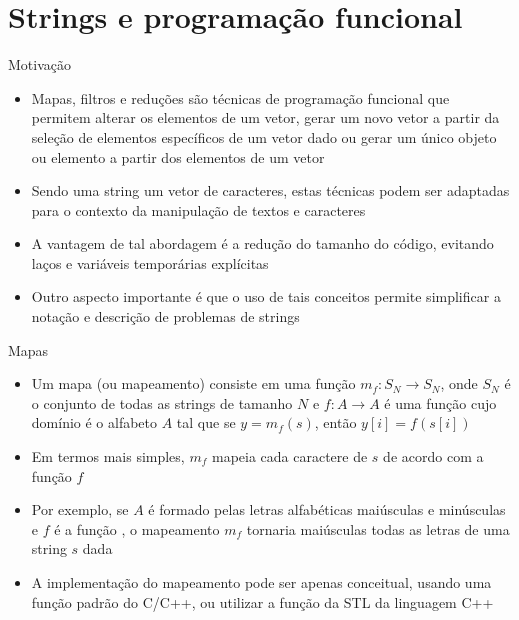 \section{Strings e programação funcional}

\begin{frame}[fragile]{Motivação}

    \begin{itemize}
        \item Mapas, filtros e reduções são técnicas de programação funcional que permitem alterar os elementos de um vetor, gerar um novo vetor a partir da seleção de elementos específicos de um vetor dado ou gerar um único objeto ou elemento a partir dos elementos de um vetor
        \pause

        \item Sendo uma string um vetor de caracteres, estas técnicas podem ser adaptadas para o contexto da manipulação de textos e caracteres
        \pause

        \item A vantagem de tal abordagem é a redução do tamanho do código, evitando laços e
            variáveis temporárias explícitas
        \pause

        \item Outro aspecto importante é que o uso de tais conceitos permite simplificar a
            notação e descrição de problemas de strings
    \end{itemize}

\end{frame}

\begin{frame}[fragile]{Mapas}

    \begin{itemize}
        \item Um mapa (ou mapeamento) consiste em uma função $m_f: S_N \to S_N$, 
            onde $S_N$ é o conjunto de todas as strings de tamanho $N$ e $f: A \to A$ é uma função 
            cujo domínio é o alfabeto $A$ tal que se $y = m_f(s)$, então $y[i] = f(s[i])$
        \pause

        \item Em termos mais simples, $m_f$ mapeia cada caractere de $s$ de acordo com a função $f$
        \pause

        \item Por exemplo, se $A$ é formado pelas letras alfabéticas maiúsculas e minúsculas e 
            $f$ é a função , o mapeamento $m_f$ tornaria maiúsculas todas as 
            letras de uma string $s$ dada
        \pause

        \item A implementação do mapeamento pode ser apenas conceitual, usando uma função padrão
            do C/C++, ou utilizar a função  da STL da linguagem C++
    \end{itemize}

\end{frame}

